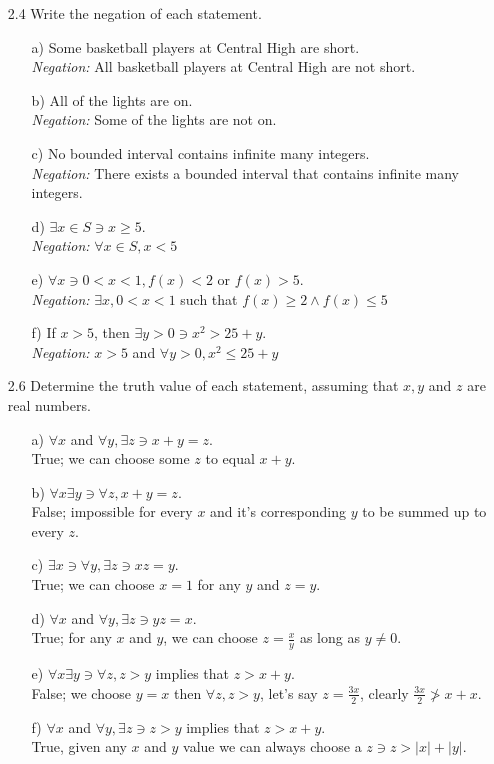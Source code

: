 \documentclass[12pt]{article}
\begin{document}
\begin{enumerate}
\item[2.4] Write the negation of each statement.
\begin{enumerate}
\item[a)] Some basketball players at Central High are short.\\
\emph{Negation:} All basketball players at Central High are not short.
\item[b)] All of the lights are on.\\
\emph{Negation:} Some of the lights are not on.
\item[c)] No bounded interval contains infinite many integers.\\
\emph{Negation:} There exists a bounded interval that contains infinite many integers.
\item[d)] $\exists x \in S \ni x \geq 5$. \\
\emph{Negation:} $\forall x \in S, x < 5$
\item[e)] $\forall x \ni 0 < x < 1, f(x) < 2$ or $f(x) > 5$.\\
\emph{Negation:} $\exists x, 0 < x < 1$ such that $f(x) \geq 2 \wedge f(x) \leq 5$
\item[f)] If $x > 5$, then $\exists y > 0 \ni x^2 > 25 + y$.\\
\emph{Negation:} $x > 5$ and $\forall y > 0, x^2 \leq 25 + y$
\end{enumerate}

\item[2.6] Determine the truth value of each statement, assuming that $x, y$ and $z$ are real numbers.
\begin{enumerate}
\item[a)] $\forall x$ and $\forall y, \exists z \ni x + y = z$.\\
True; we can choose some $z$ to equal $x + y$.
\item[b)] $\forall x \exists y \ni \forall z, x + y = z$.\\
False; impossible for every $x$ and it's corresponding $y$ to be summed up to every $z$.
\item[c)] $\exists x \ni \forall y, \exists z \ni xz = y$.\\
True; we can choose $x = 1$ for any $y$ and $z = y$.
\item[d)] $\forall x$ and $\forall y, \exists z \ni yz = x$.\\
True; for any $x$ and $y$, we can choose $z = \frac{x}{y}$ as long as $y \not= 0$.
\item[e)] $\forall x \exists y \ni \forall z, z > y$ implies that $z > x + y$.\\
False; we choose $y = x$ then $\forall z, z > y$, let's say $z = \frac{3x}{2}$, clearly
$\frac{3x}{2} \not> x + x$.
\item[f)] $\forall x$ and $\forall y, \exists z \ni z > y$ implies that $z > x + y$.\\
True, given any $x$ and $y$ value we can always choose a $z \ni z > |x| + |y|$.
\end{enumerate}


\end{enumerate}
\end{document}
